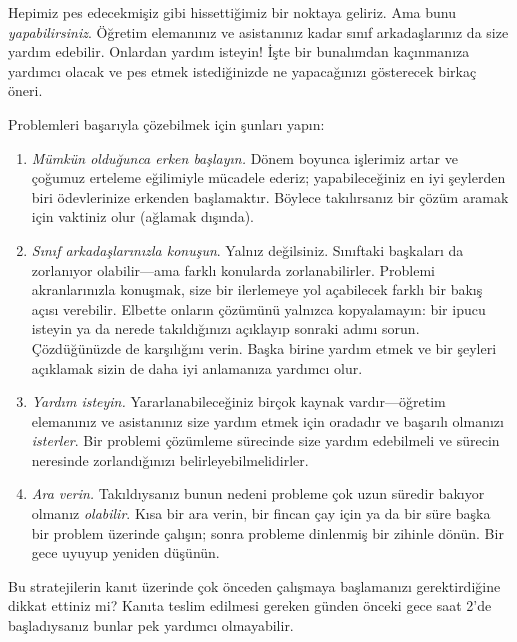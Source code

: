 



Hepimiz pes edecekmişiz gibi hissettiğimiz bir noktaya geliriz. Ama
bunu \emph{yapabilirsiniz}. Öğretim elemanınız ve asistanınız kadar
sınıf arkadaşlarınız da size yardım edebilir. Onlardan yardım isteyin!{}
İşte bir bunalımdan kaçınmanıza yardımcı olacak ve pes etmek
istediğinizde ne yapacağınızı gösterecek birkaç öneri.

Problemleri başarıyla çözebilmek için şunları yapın:
\begin{enumerate}
\item \emph{Mümkün olduğunca erken başlayın.} Dönem boyunca işlerimiz
  artar ve çoğumuz erteleme eğilimiyle mücadele ederiz; yapabileceğiniz
  en iyi şeylerden biri ödevlerinize erkenden başlamaktır. Böylece
  takılırsanız bir çözüm aramak için vaktiniz olur (ağlamak dışında).
\item \emph{Sınıf arkadaşlarınızla konuşun}. Yalnız değilsiniz.
  Sınıftaki başkaları da zorlanıyor olabilir---ama farklı konularda
  zorlanabilirler. Problemi akranlarınızla konuşmak, size bir ilerlemeye
  yol açabilecek farklı bir bakış açısı verebilir. Elbette onların
  çözümünü yalnızca kopyalamayın: bir ipucu isteyin ya da nerede
  takıldığınızı açıklayıp sonraki adımı sorun. Çözdüğünüzde de karşılığını
  verin. Başka birine yardım etmek ve bir şeyleri açıklamak sizin de
  daha iyi anlamanıza yardımcı olur.
\item \emph{Yardım isteyin.} Yararlanabileceğiniz birçok kaynak
  vardır---öğretim elemanınız ve asistanınız size yardım etmek için
  oradadır ve başarılı olmanızı \emph{isterler}. Bir problemi çözümleme
  sürecinde size yardım edebilmeli ve sürecin neresinde zorlandığınızı
  belirleyebilmelidirler.
\item \emph{Ara verin.} Takıldıysanız bunun nedeni probleme çok uzun
  süredir bakıyor olmanız \emph{olabilir}. Kısa bir ara verin, bir fincan
  çay için ya da bir süre başka bir problem üzerinde çalışın; sonra
  probleme dinlenmiş bir zihinle dönün. Bir gece uyuyup yeniden düşünün.
\end{enumerate}

Bu stratejilerin kanıt üzerinde çok önceden çalışmaya başlamanızı
gerektirdiğine dikkat ettiniz mi? Kanıta teslim edilmesi gereken günden
önceki gece saat 2'de başladıysanız bunlar pek yardımcı olmayabilir.

